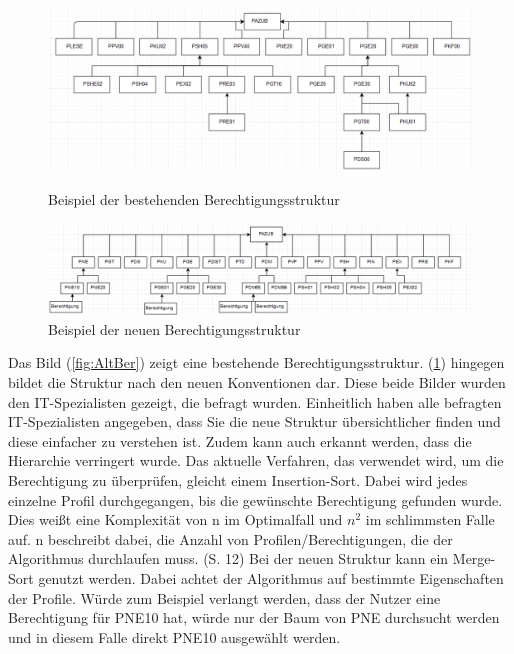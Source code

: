 \begin{figure}[h!]
\hspace*{-2cm}
 \centering
 \includegraphics[width=1.25\textwidth]{gfx/Picture/Vorher.PNG}
 \caption{Beispiel der bestehenden Berechtigungsstruktur}
 \label{fig:AltBer}
\hspace*{-2cm}
 \centering
 \includegraphics[width=1.25\textwidth]{gfx/Picture/Nachher.PNG}
 \caption{Beispiel der neuen Berechtigungsstruktur}
 \label{fig:NeuBer}
\end{figure}
Das Bild (\ref{fig:AltBer}) zeigt eine bestehende Berechtigungsstruktur.
(\ref{fig:NeuBer}) hingegen bildet die Struktur nach den neuen Konventionen dar.
Diese beide Bilder wurden den IT-Spezialisten gezeigt, die befragt wurden.
Einheitlich haben alle befragten IT-Spezialisten angegeben, dass Sie die neue Struktur übersichtlicher finden und diese einfacher zu verstehen ist.
Zudem kann auch erkannt werden, dass die Hierarchie verringert wurde.
\newline
Das aktuelle Verfahren, das verwendet wird, um die Berechtigung zu überprüfen, gleicht einem Insertion-Sort.
Dabei wird jedes einzelne Profil durchgegangen, bis die gewünschte Berechtigung gefunden wurde.
Dies weißt eine Komplexität von n im Optimalfall und $n^2$ im schlimmsten Falle auf.
n beschreibt dabei, die Anzahl von Profilen/Berechtigungen, die der Algorithmus durchlaufen muss. \cite{weblogIn,log} (S. 12)
\newline
Bei der neuen Struktur kann ein Merge-Sort genutzt werden.
Dabei achtet der Algorithmus auf bestimmte Eigenschaften der Profile.
Würde zum Beispiel verlangt werden, dass der Nutzer eine Berechtigung für PNE10 hat, würde nur der Baum von PNE durchsucht werden und in diesem Falle direkt PNE10 ausgewählt werden.
